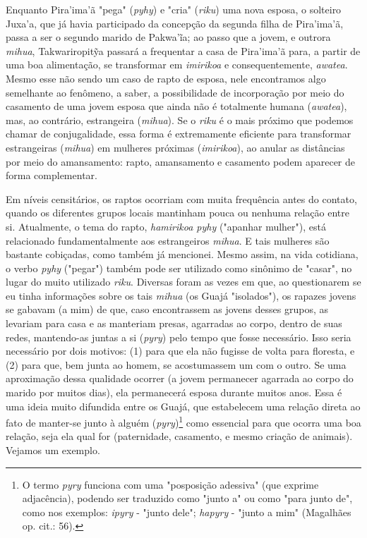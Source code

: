 

Enquanto Pira'ima'ã "pega" (\emph{pyhy}) e "cria" (\emph{riku}) uma nova
esposa, o solteiro Juxa'a, que já havia participado da concepção da
segunda filha de Pira'ima'ã, passa a ser o segundo marido de Pakwa'ĩa;
ao passo que a jovem, e outrora \emph{mihua}, Takwariropitỹa passará a
frequentar a casa de Pira'ima'ã para, a partir de uma boa alimentação,
se transformar em \emph{imirikoa} e consequentemente, \emph{awatea}.
Mesmo esse não sendo um caso de rapto de esposa, nele encontramos algo
semelhante ao fenômeno, a saber, a possibilidade de incorporação por
meio do casamento de uma jovem esposa que ainda não é totalmente humana
(\emph{awatea}), mas, ao contrário, estrangeira (\emph{mihua}). Se o
\emph{riku} é o mais próximo que podemos chamar de conjugalidade, essa
forma é extremamente eficiente para transformar estrangeiras
(\emph{mihua}) em mulheres próximas (\emph{imirikoa}), ao anular as
distâncias por meio do amansamento: rapto, amansamento e casamento podem
aparecer de forma complementar.

Em níveis censitários, os raptos ocorriam com muita frequência antes do
contato, quando os diferentes grupos locais mantinham pouca ou nenhuma
relação entre si. Atualmente, o tema do rapto, \emph{hamirikoa pyhy}
("apanhar mulher"), está relacionado fundamentalmente aos estrangeiros
\emph{mihua}. E tais mulheres são bastante cobiçadas, como também já
mencionei. Mesmo assim, na vida cotidiana, o verbo \emph{pyhy} ("pegar")
também pode ser utilizado como sinônimo de "casar", no lugar do muito
utilizado \emph{riku}. Diversas foram as vezes em que, ao questionarem
se eu tinha informações sobre os tais \emph{mihua} (os Guajá
"isolados"), os rapazes jovens se gabavam (a mim) de que, caso
encontrassem as jovens desses grupos, as levariam para casa e as
manteriam presas, agarradas ao corpo, dentro de suas redes, mantendo-as
juntas a si (\emph{pyry}) pelo tempo que fosse necessário. Isso seria
necessário por dois motivos: (1) para que ela não fugisse de volta para
floresta, e (2) para que, bem junta ao homem, se acostumassem um com o
outro. Se uma aproximação dessa qualidade ocorrer (a jovem permanecer
agarrada ao corpo do marido por muitos dias), ela permanecerá esposa
durante muitos anos. Essa é uma ideia muito difundida entre os Guajá,
que estabelecem uma relação direta ao fato de manter-se junto à alguém
(\emph{pyry})\footnote{O termo \emph{pyry} funciona com uma "posposição
  adessiva" (que exprime adjacência), podendo ser traduzido como "junto
  a" ou como "para junto de", como nos exemplos: \emph{ipyry} - "junto
  dele"; \emph{hapyry} - "junto a mim" (Magalhães op. cit.: 56).} como
essencial para que ocorra uma boa relação, seja ela qual for
(paternidade, casamento, e mesmo criação de animais). Vejamos um
exemplo.

